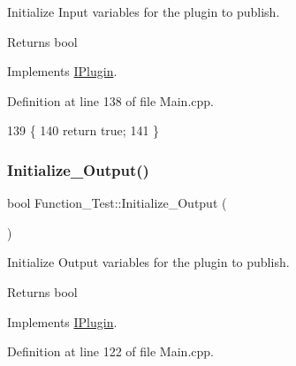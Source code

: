 Initialize Input variables for the plugin to publish. 

\begin{DoxyReturn}{Returns}
bool 
\end{DoxyReturn}


Implements \hyperlink{class_i_plugin_aa7c66743ad956d8ada57becee559af4d}{I\+Plugin}.



Definition at line 138 of file Main.\+cpp.


\begin{DoxyCode}
139 \{
140     \textcolor{keywordflow}{return} \textcolor{keyword}{true};
141 \}
\end{DoxyCode}
\mbox{\label{class_function___test_afffb9c39e5b1178774cc3a1191124409}} 
\subsubsection{\texorpdfstring{Initialize\+\_\+\+Output()}{Initialize\_Output()}}
{\footnotesize\ttfamily bool Function\+\_\+\+Test\+::\+Initialize\+\_\+\+Output (\begin{DoxyParamCaption}{ }\end{DoxyParamCaption})\hspace{0.3cm}{\ttfamily [virtual]}}



Initialize Output variables for the plugin to publish. 

\begin{DoxyReturn}{Returns}
bool 
\end{DoxyReturn}


Implements \hyperlink{class_i_plugin_a0b772513fc8c4ed01240e19c4bb84068}{I\+Plugin}.



Definition at line 122 of file Main.\+cpp.


